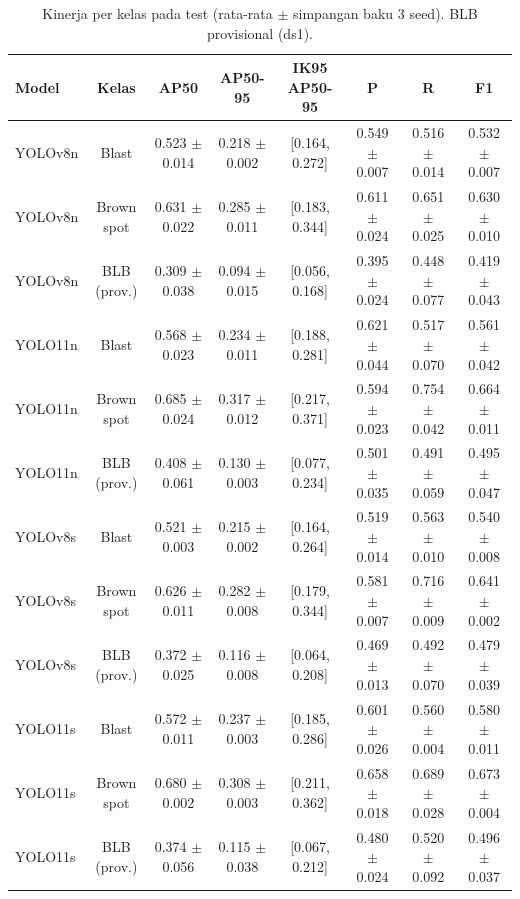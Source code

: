 \begin{table}[!t]
\centering
\caption{Kinerja per kelas pada test (rata-rata $\pm$ simpangan baku 3 seed). BLB provisional (ds1).}
\label{tab:per_kelas_test}
\footnotesize
\begin{tabular}{lccccccc}
\hline
\textbf{Model} & \textbf{Kelas} & \textbf{AP50} & \textbf{AP50-95} & \textbf{IK95 AP50-95} & \textbf{P} & \textbf{R} & \textbf{F1} \\
\hline
YOLOv8n & Blast & 0.523 $\pm$ 0.014 & 0.218 $\pm$ 0.002 & [0.164, 0.272] & 0.549 $\pm$ 0.007 & 0.516 $\pm$ 0.014 & 0.532 $\pm$ 0.007 \\
YOLOv8n & Brown spot & 0.631 $\pm$ 0.022 & 0.285 $\pm$ 0.011 & [0.183, 0.344] & 0.611 $\pm$ 0.024 & 0.651 $\pm$ 0.025 & 0.630 $\pm$ 0.010 \\
YOLOv8n & BLB (prov.) & 0.309 $\pm$ 0.038 & 0.094 $\pm$ 0.015 & [0.056, 0.168] & 0.395 $\pm$ 0.024 & 0.448 $\pm$ 0.077 & 0.419 $\pm$ 0.043 \\
YOLO11n & Blast & 0.568 $\pm$ 0.023 & 0.234 $\pm$ 0.011 & [0.188, 0.281] & 0.621 $\pm$ 0.044 & 0.517 $\pm$ 0.070 & 0.561 $\pm$ 0.042 \\
YOLO11n & Brown spot & 0.685 $\pm$ 0.024 & 0.317 $\pm$ 0.012 & [0.217, 0.371] & 0.594 $\pm$ 0.023 & 0.754 $\pm$ 0.042 & 0.664 $\pm$ 0.011 \\
YOLO11n & BLB (prov.) & 0.408 $\pm$ 0.061 & 0.130 $\pm$ 0.003 & [0.077, 0.234] & 0.501 $\pm$ 0.035 & 0.491 $\pm$ 0.059 & 0.495 $\pm$ 0.047 \\
YOLOv8s & Blast & 0.521 $\pm$ 0.003 & 0.215 $\pm$ 0.002 & [0.164, 0.264] & 0.519 $\pm$ 0.014 & 0.563 $\pm$ 0.010 & 0.540 $\pm$ 0.008 \\
YOLOv8s & Brown spot & 0.626 $\pm$ 0.011 & 0.282 $\pm$ 0.008 & [0.179, 0.344] & 0.581 $\pm$ 0.007 & 0.716 $\pm$ 0.009 & 0.641 $\pm$ 0.002 \\
YOLOv8s & BLB (prov.) & 0.372 $\pm$ 0.025 & 0.116 $\pm$ 0.008 & [0.064, 0.208] & 0.469 $\pm$ 0.013 & 0.492 $\pm$ 0.070 & 0.479 $\pm$ 0.039 \\
YOLO11s & Blast & 0.572 $\pm$ 0.011 & 0.237 $\pm$ 0.003 & [0.185, 0.286] & 0.601 $\pm$ 0.026 & 0.560 $\pm$ 0.004 & 0.580 $\pm$ 0.011 \\
YOLO11s & Brown spot & 0.680 $\pm$ 0.002 & 0.308 $\pm$ 0.003 & [0.211, 0.362] & 0.658 $\pm$ 0.018 & 0.689 $\pm$ 0.028 & 0.673 $\pm$ 0.004 \\
YOLO11s & BLB (prov.) & 0.374 $\pm$ 0.056 & 0.115 $\pm$ 0.038 & [0.067, 0.212] & 0.480 $\pm$ 0.024 & 0.520 $\pm$ 0.092 & 0.496 $\pm$ 0.037 \\
\hline
\end{tabular}
\end{table}
